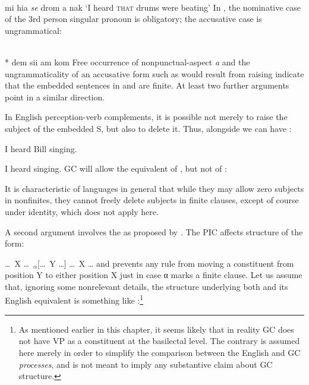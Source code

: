 \ea\label{ex:2:134}
\langinfo{\langGC}{}{}\\
mi hia \textit{se} drom a nak
\glt `I heard {\scshape that} drums were beating'
\z
In , the nominative case of the 3rd person singular pronoun is obligatory; the accusative case is ungrammatical:

\ea\label{ex:2:135}
\langinfo{\langGC}{}{}\\
\textnormal{*} dem sii am kom
\z
Free occurrence of nonpunctual-aspect \textit{a} and the ungrammaticality of an accusative form such as would result from raising indicate that the embedded sentences in  and  are finite. At least two further arguments point in a similar direction.

In English perception-verb complements, it is possible not merely to raise the subject of the embedded S, but also to delete it. Thus, alongside  we can have :

\ea\label{ex:2:136}I heard Bill singing.\z

\ea\label{ex:2:137}I heard singing.\z
GC will allow the equivalent of , but not of :

\z

\z
It is characteristic of languages in general that while they may allow zero subjects in nonfinites, they cannot freely delete subjects in finite clauses, except of course under identity, which does not apply here.

A second argument involves the  as proposed by \citet{Chomsky1977}. The PIC affects structure of the form:

\ea\label{ex:2:140}\ldots~X \ldots~$_{\alpha}$[\ldots~Y \ldots] \ldots~X \ldots \z
and prevents any rule from moving a constituent from position Y to either position X just in case α marks a finite clause. Let us assume that, ignoring some nonrelevant details, the structure underlying both  and its English equivalent is something like :\footnote{As mentioned earlier in this chapter, it seems likely that in reality GC does not have VP as a constituent at the basilectal level. The contrary is assumed here merely in order to simplify the comparison between the English and GC \textit{processes}, and is not meant to imply any substantive claim about GC structure.}

